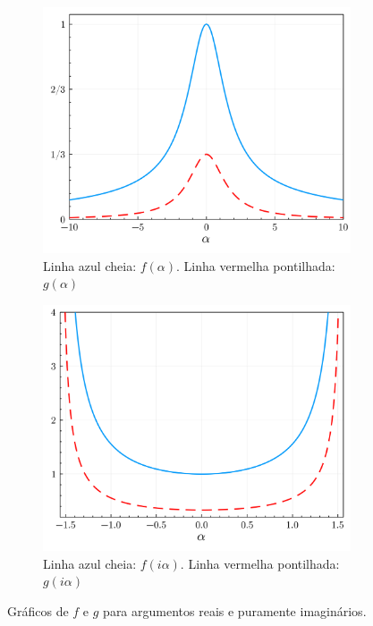 \documentclass[
	12pt,
	oneside,			%
	a4paper,			%
	english,			%
	brazil				%
	]{abntex2}
\theoremstyle{definition}
\begin{document}
\begin{figure}[H]
     \centering
     \begin{subfigure}[b]{0.48\textwidth}
         \centering
         \includegraphics[width=\textwidth]{Imagens/fg.png}
         \caption{Linha azul cheia: $f(\alpha)$. Linha vermelha pontilhada: $g(\alpha)$}
         \label{f e g}
     \end{subfigure}
     \hfill
     \begin{subfigure}[b]{0.48\textwidth}
         \centering
         \includegraphics[width=\textwidth]{Imagens/fgi.png}
         \caption{Linha azul cheia: $f(i\alpha)$. Linha vermelha pontilhada: $g(i\alpha)$}
         \label{fi e gi}
     \end{subfigure}
     \caption{Gráficos de $f$ e $g$ para argumentos reais e puramente imaginários.}
        \label{f e g total}
\end{figure}
\end{document}
